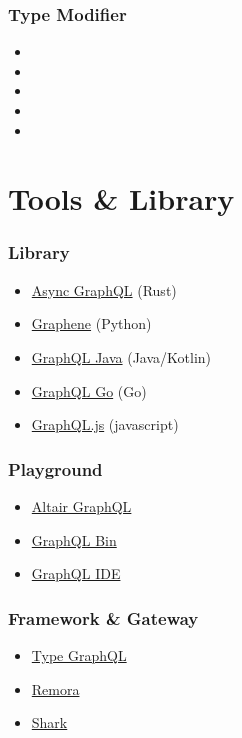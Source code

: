 \documentclass[12pt,xcolor=table]{beamer}
\begin{document}
\begin{frame}
\frametitle{Type Modifier}
\begin{itemize}\small
    \item {}
    \item {}
    \item {}
    \item {}
    \item {}
\end{itemize}
\end{frame}

\section{Tools & Library}

\begin{frame}
\frametitle{Library}
\begin{itemize}\small
    \item \href{https://github.com/async-graphql/async-graphql}{Async GraphQL} (Rust)
    \item \href{http://graphene-python.org/}{Graphene} (Python)
    \item \href{https://github.com/graphql-java/graphql-java}{GraphQL Java} (Java/Kotlin)
    \item \href{https://github.com/graphql-go/graphql}{GraphQL Go} (Go)
    \item \href{https://graphql.org/graphql-js/}{GraphQL.js} (javascript)
\end{itemize}
\end{frame}

\begin{frame}
\frametitle{Playground}
\begin{itemize}\small
    \item \href{https://altairgraphql.dev/}{Altair GraphQL}
    \item \href{https://www.graphqlbin.com/v2/new}{GraphQL Bin}
    \item \href{https://github.com/graphql/graphql-playground}{GraphQL IDE}
\end{itemize}
\end{frame}

\begin{frame}
\frametitle{Framework \& Gateway}
\begin{itemize}\small
    \item \href{https://typegraphql.com/}{Type GraphQL}
    \item \href{https://github.com/graphteon/remora}{Remora}
    \item \href{https://github.com/graphteon/shark}{Shark}
\end{itemize}
\end{frame}
\end{document}
